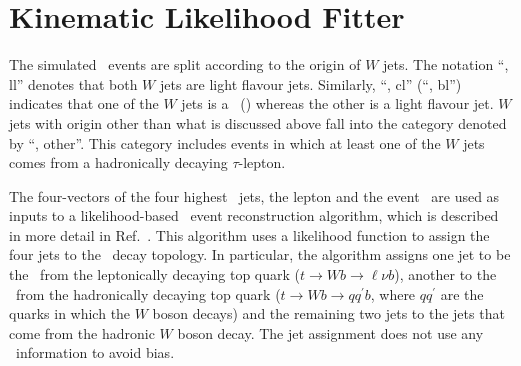 \section{Kinematic Likelihood Fitter}
\label{KLFitter}

The simulated \ttbar\
events are split according to the origin of $W$ jets. The notation
``\ttbar, ll'' denotes that both $W$ jets are light flavour jets.
Similarly, ``\ttbar, cl'' (``\ttbar, bl'') 
indicates that one of the $W$ jets is a \cjet\ (\bjet)
whereas the other is a light flavour jet. $W$ jets with origin
other than what is discussed above fall into the 
category denoted by ``\ttbar, other''. This category includes
events in which at least one of the $W$ jets comes from a
hadronically decaying $\tau$-lepton. 

The four-vectors of the four highest \pt\ jets, the lepton and the
event \MET\ are used as inputs to a likelihood-based \ttbar\ event
reconstruction algorithm, which is described in more detail in
Ref.~\cite{ERDMANN201418}. This algorithm uses a likelihood function
to assign the four jets to the \ttbar\ decay topology. In particular,
the algorithm assigns one jet to be the \bjet\ from the leptonically
decaying top quark ($t\to Wb \to \ell \nu b$), another to the \bjet\
from the hadronically decaying top quark ($t\to Wb \to qq^\prime b$,
where $qq^\prime$ are the quarks in which the $W$ boson decays) and
the remaining two jets to the jets that come from the hadronic $W$
boson decay. The jet assignment does not use any \btagging\ information
to avoid bias.



